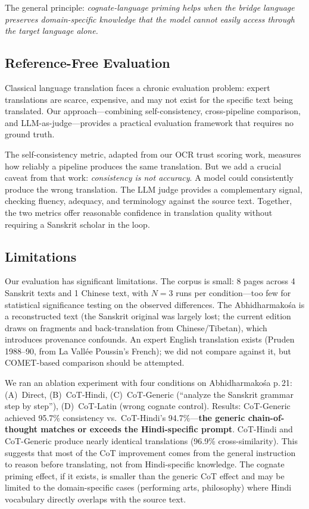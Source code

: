 \documentclass[10pt,twocolumn]{article}
\begin{document}
The general principle: \emph{cognate-language priming helps when the bridge language preserves domain-specific knowledge that the model cannot easily access through the target language alone.}

\subsection{Reference-Free Evaluation}

Classical language translation faces a chronic evaluation problem: expert translations are scarce, expensive, and may not exist for the specific text being translated. Our approach---combining self-consistency, cross-pipeline comparison, and LLM-as-judge---provides a practical evaluation framework that requires no ground truth.

The self-consistency metric, adapted from our OCR trust scoring work, measures how reliably a pipeline produces the same translation. But we add a crucial caveat from that work: \emph{consistency is not accuracy}. A model could consistently produce the wrong translation. The LLM judge provides a complementary signal, checking fluency, adequacy, and terminology against the source text. Together, the two metrics offer reasonable confidence in translation quality without requiring a Sanskrit scholar in the loop.

\subsection{Limitations}

Our evaluation has significant limitations. The corpus is small: 8 pages across 4 Sanskrit texts and 1 Chinese text, with $N{=}3$ runs per condition---too few for statistical significance testing on the observed differences. The Abhidharmako\'sa is a reconstructed text (the Sanskrit original was largely lost; the current edition draws on fragments and back-translation from Chinese/Tibetan), which introduces provenance confounds. An expert English translation exists (Pruden 1988--90, from La Vall\'ee Poussin's French); we did not compare against it, but COMET-based comparison should be attempted.

We ran an ablation experiment with four conditions on Abhidharmako\'sa p.\,21: (A)~Direct, (B)~CoT-Hindi, (C)~CoT-Generic (``analyze the Sanskrit grammar step by step''), (D)~CoT-Latin (wrong cognate control). Results: CoT-Generic achieved 95.7\% consistency vs.\ CoT-Hindi's 94.7\%---\textbf{the generic chain-of-thought matches or exceeds the Hindi-specific prompt}. CoT-Hindi and CoT-Generic produce nearly identical translations (96.9\% cross-similarity). This suggests that most of the CoT improvement comes from the general instruction to reason before translating, not from Hindi-specific knowledge. The cognate priming effect, if it exists, is smaller than the generic CoT effect and may be limited to the domain-specific cases (performing arts, philosophy) where Hindi vocabulary directly overlaps with the source text.
\end{document}
